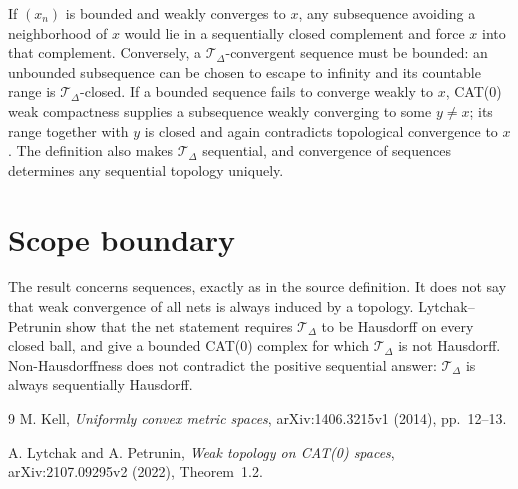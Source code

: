 \documentclass[11pt]{article}
\begin{document}
If $(x_n)$ is bounded and weakly converges to $x$, any subsequence avoiding a neighborhood of $x$ would lie in a sequentially closed complement and force $x$ into that complement.  Conversely, a $\mathcal T_\Delta$-convergent sequence must be bounded: an unbounded subsequence can be chosen to escape to infinity and its countable range is $\mathcal T_\Delta$-closed.  If a bounded sequence fails to converge weakly to $x$, CAT(0) weak compactness supplies a subsequence weakly converging to some $y\ne x$; its range together with $y$ is closed and again contradicts topological convergence to $x$.  The definition also makes $\mathcal T_\Delta$ sequential, and convergence of sequences determines any sequential topology uniquely.

\section*{Scope boundary}
The result concerns sequences, exactly as in the source definition.  It does not say that weak convergence of all nets is always induced by a topology.  Lytchak--Petrunin show that the net statement requires $\mathcal T_\Delta$ to be Hausdorff on every closed ball, and give a bounded CAT(0) complex for which $\mathcal T_\Delta$ is not Hausdorff.  Non-Hausdorffness does not contradict the positive sequential answer: $\mathcal T_\Delta$ is always sequentially Hausdorff.

{\raggedright
\begin{thebibliography}{9}
M. Kell,
\emph{Uniformly convex metric spaces},
arXiv:1406.3215v1 (2014), pp.~12--13.

A. Lytchak and A. Petrunin,
\emph{Weak topology on CAT(0) spaces},
arXiv:2107.09295v2 (2022), Theorem~1.2.
\end{thebibliography}
\par}
\end{document}
